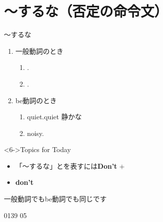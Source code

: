 \documentclass[aspectratio=169,xcolor={dvipsnames,table}]{beamer}
\begin{document}
\section{～するな（否定の命令文）}
\begin{frame}[plain]{～するな}
  \begin{enumerate}
    \item<1-> 一般動詞のとき
          \begin{enumerate}
            \item<2-> .
            \item<3->  .
          \end{enumerate}
    \item<1-> be動詞のとき
          \begin{enumerate}
            \item<4->  quiet.\hfill{\scriptsize quiet  静かな}
            \item<5->   noisy.\hfill{}
          \end{enumerate}
  \end{enumerate}

  \begin{block}<6->{Topics for Today}
    \begin{itemize}[square]\small
      \item 「～するな」とを表すには\textbf{Don't} $+$ 
      \item \textbf{don't} 
    \end{itemize}
    \hfill{\scriptsize 一般動詞でもbe動詞でも同じです}
  \end{block}

  \hfill{\tiny 0139}\,{\scriptsize {}}\,{\tiny 05}
\end{frame}
\end{document}
